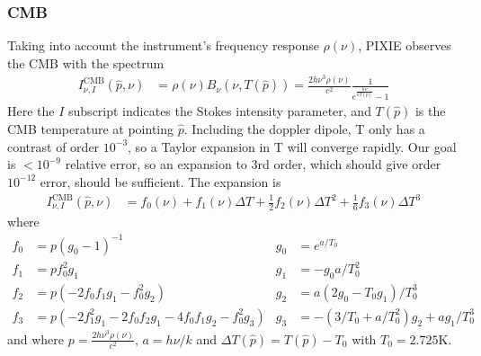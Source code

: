 \documentclass{article}
\begin{document}
\subsubsection{CMB}
\label{sect:cmb}
Taking into account the instrument's frequency response $\rho(\nu)$, PIXIE
observes the CMB with the spectrum
\begin{align}
I^\textrm{CMB}_{\nu,I}(\hat p, \nu) &= \rho(\nu)B_\nu(\nu, T(\hat p)) = \frac{2h\nu^3\rho(\nu)}{c^2}\frac{1}{e^{\frac{h\nu}{kT(\hat p)}} - 1}
\end{align}
Here the $I$ subscript indicates the Stokes intensity parameter, and $T(\hat p)$ is the
CMB temperature at pointing $\hat p$.
Including the doppler dipole, T only has a contrast of order $10^{-3}$, so a Taylor
expansion in T will converge rapidly. Our goal is $<10^{-9}$ relative error, so an
expansion to 3rd order, which should give order $10^{-12}$ error, should be sufficient.
The expansion is
\begin{align}
	I^\textrm{CMB}_{\nu,I}(\hat p, \nu) &= f_0(\nu) + f_1(\nu) \Delta T + \frac12 f_2(\nu) \Delta T^2 + \frac16 f_3(\nu) \Delta T^3
\end{align}
where
\begin{align*}
	f_0 &= p(g_0-1)^{-1}    & g_0 &= e^{a/T_0} \\
	f_1 &= pf_0^2 g_1       & g_1 &= -g_0 a/T_0^2 \\
	f_2 &= p(-2 f_0 f_1 g_1 - f_0^2 g_2) &
	g_2 &= a(2 g_0-T_0 g_1)/T_0^3 \\
	f_3 &= p(-2 f_1^2 g_1 - 2f_0 f_2 g_1 - 4 f_0 f_1 g_2 - f_0^2 g_3) &
	g_3 &= -(3/T_0 + a/T_0^2)g_2 + a g_1/T_0^3
\end{align*}
and where $p = \frac{2h\nu^3\rho(\nu)}{c^2}$, $a = h\nu/k$ and $\Delta T(\hat p) = T(\hat p)-T_0$ with $T_0 = 2.725$K. 
\end{document}
